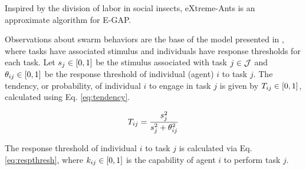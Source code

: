 %	

Inspired by the division of labor in social insects, eXtreme-Ants is an approximate algorithm for E-GAP. %

Observations about swarm behaviors are the base of the model presented in \citep{Theraulaz+1998}, where tasks have associated stimulus %
and individuals have response thresholds for each task. Let $s_j \in [0,1]$ be the stimulus associated with task $j \in \mathcal{J}$ and $\theta_{ij} \in [0,1]$ be the response threshold of individual (agent) $i$ to task $j$. The tendency, or probability, of individual $i$ to engage in task $j$ is given by $T_{ij} \in [0,1]$, calculated using Eq. \ref{eq:tendency}.

\begin{equation}
\label{eq:tendency}
T_{ij} = \frac{s_j^2}{s_j^2 + \theta_{ij}^2}
\end{equation}

The response threshold  of individual $i$ to task $j$ is calculated via Eq. \ref{eq:respthresh}, where $k_{ij} \in [0,1]$ is the capability of agent $i$ to perform task $j$.

